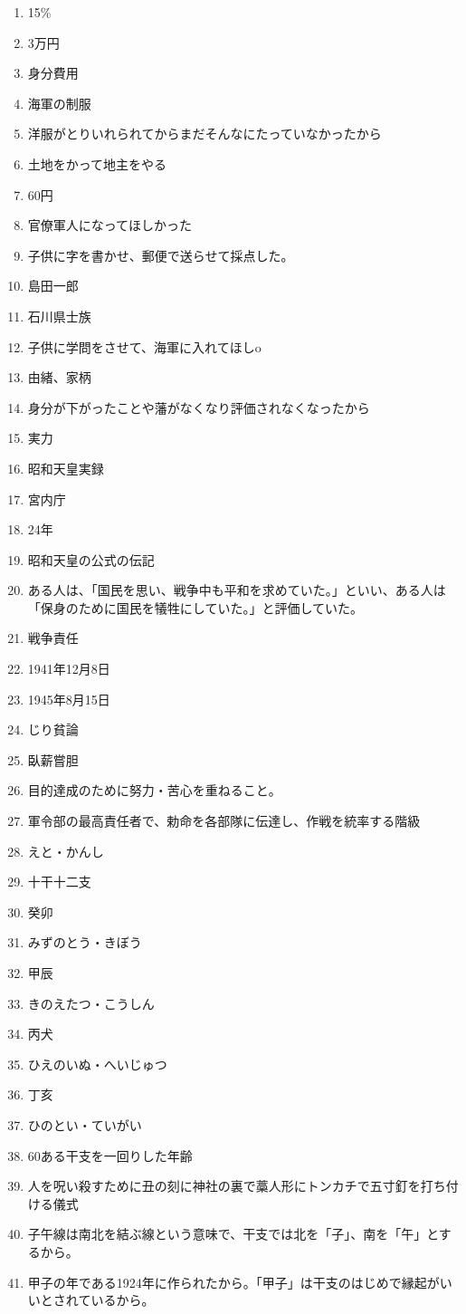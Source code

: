 \documentclass[]{jsarticle}
\begin{document}
\begin{enumerate}
	\item 15\%
	\item 3万円
	\item 身分費用
	\item 海軍の制服
	\item 洋服がとりいれられてからまだそんなにたっていなかったから
	\item 土地をかって地主をやる
	\item 60円
	\item 官僚軍人になってほしかった
	\item 子供に字を書かせ、郵便で送らせて採点した。
	\item 島田一郎
	\item 石川県士族
	\item 子供に学問をさせて、海軍に入れてほしo
	\item 由緒、家柄
	\item 身分が下がったことや藩がなくなり評価されなくなったから
	\item 実力
	      \\
	\item 昭和天皇実録
	\item 宮内庁
	\item 24年
	\item 昭和天皇の公式の伝記
	\item ある人は、「国民を思い、戦争中も平和を求めていた。」といい、ある人は「保身のために国民を犠牲にしていた。」と評価していた。
	\item 戦争責任
	\item 1941年12月8日
	\item 1945年8月15日
	\item じり貧論
	\item 臥薪嘗胆
	\item 目的達成のために努力・苦心を重ねること。
	\item 軍令部の最高責任者で、勅命を各部隊に伝達し、作戦を統率する階級
	\item えと・かんし
	\item 十干十二支
	\item 癸卯
	\item みずのとう・きぼう
	\item 甲辰
	\item きのえたつ・こうしん
	\item 丙犬
	\item ひえのいぬ・へいじゅつ
	\item 丁亥
	\item ひのとい・ていがい
	\item 60ある干支を一回りした年齢
	\item 人を呪い殺すために丑の刻に神社の裏で藁人形にトンカチで五寸釘を打ち付ける儀式
	\item 子午線は南北を結ぶ線という意味で、干支では北を「子」、南を「午」とするから。
	\item 甲子の年である1924年に作られたから。「甲子」は干支のはじめで縁起がいいとされているから。
\end{enumerate}
\end{document}
